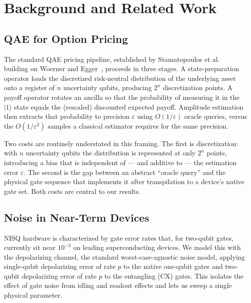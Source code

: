 \documentclass[runningheads]{llncs}
\begin{document}
\section{Background and Related Work}
\subsection{QAE for Option Pricing}
The standard QAE pricing pipeline, established by Stamatopoulos et al.~\cite{stamatopoulos2020}
building on Woerner and Egger~\cite{woerner2019}, proceeds in three stages. A
state-preparation operator loads the discretized risk-neutral distribution of
the underlying asset onto a register of $n$ uncertainty qubits, producing $2^n$
discretization points. A payoff operator rotates an ancilla so that the
probability of measuring it in the $|1\rangle$ state equals the (rescaled)
discounted expected payoff. Amplitude estimation then extracts that probability
to precision $\varepsilon$ using $O(1/\varepsilon)$ oracle queries, versus the
$O(1/\varepsilon^2)$ samples a classical estimator requires for the same
precision.

Two costs are routinely understated in this framing. The first is
discretization: with $n$ uncertainty qubits the distribution is represented at
only $2^n$ points, introducing a bias that is independent of --- and additive
to --- the estimation error $\varepsilon$. The second is the gap between an
abstract ``oracle query'' and the physical gate sequence that implements it
after transpilation to a device's native gate set. Both costs are central to our
results.

\subsection{Noise in Near-Term Devices}
NISQ hardware is characterized by gate error rates that, for two-qubit gates,
currently sit near $10^{-3}$ on leading superconducting devices. We model this
with the depolarizing channel, the standard worst-case-agnostic noise model,
applying single-qubit depolarizing error of rate $p$ to the native one-qubit
gates and two-qubit depolarizing error of rate $p$ to the entangling (CX) gates.
This isolates the effect of gate noise from idling and readout effects and lets
us sweep a single physical parameter.

\end{document}
